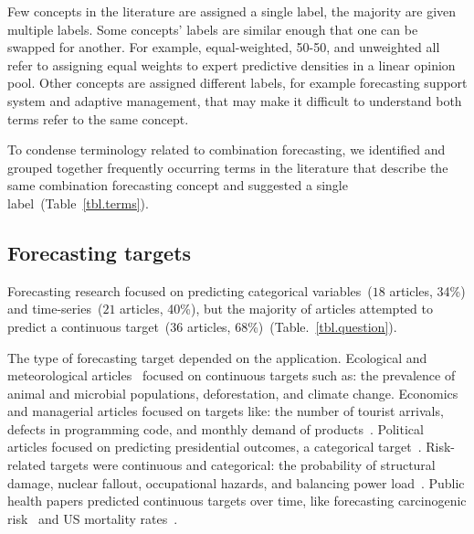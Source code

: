\documentclass[preprint,authoryear]{elsarticle}
\begin{document}
Few concepts in the literature are assigned a single label, the majority are given multiple labels.
Some concepts' labels are similar enough that one can be swapped for another.
For example, equal-weighted, 50-50, and unweighted all refer to assigning equal weights to expert predictive densities in a linear opinion pool. 
Other concepts are assigned different labels, for example forecasting support system and adaptive management, that may make it difficult to understand both terms refer to the same concept.

To condense terminology related to combination forecasting, we identified and grouped together frequently occurring terms in the literature that describe the same combination forecasting concept and suggested a single label~(Table~\ref{tbl.terms}).

\subsection{Forecasting targets}

Forecasting research focused on predicting categorical variables~($18$ articles, 34\%) and time-series~($21$ articles, 40\%), but
the majority of articles attempted to predict a continuous target~($36$ articles, $68$\%)~(Table.~\ref{tbl.question}).

The type of forecasting target depended on the application.
Ecological and meteorological articles~\citep{johnson2018making,cooke2014out,li2012preliminary,tartakovsky2007probabilistic,morales2017characterization,borsuk2004predictive,abramson1996hailfinder,mantyka2014understanding,kurowicka2010probabilistic,wang2018bayesian} focused on continuous targets such as: the prevalence of animal and microbial populations, deforestation, and climate change.
Economics and managerial articles focused on targets like: the number of tourist arrivals, defects in programming code, and monthly demand of products~\citep{song2013combining,kabak2008aggregating,huang2016improving,failing2004using,shin2013robust}.
Political articles focused on predicting presidential outcomes, a categorical target~\citep{hurley2002combining,graefe2014accuracy,morgan2014use,graefe2015accuracy,graefe2018predicting,graefe2014combining}.
Risk-related targets were continuous and categorical: the probability of structural damage, nuclear fallout, occupational hazards, and balancing power load~\citep{klas2010support,zio1997accounting,cabello2012combination,adams2009acceptability,neves2008life,jana2019interval,hathout2016uncertainty,wang2008probabilistic,ren2002optimal,zio1996use,baecke2017investigating,brito2016bayesian,craig2001bayesian,mu1999multi,brito2012behavioral}.
Public health papers predicted continuous targets over time, like forecasting carcinogenic risk~\citep{evans1994use} and US mortality rates~\cite{alho1992estimating}.
\end{document}

